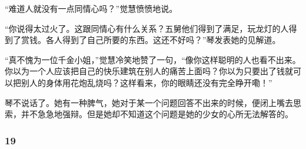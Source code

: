 \par “难道人就没有一点同情心吗？”觉慧愤愤地说。
\par “你说得太过火了。这跟同情心有什么关系？五舅他们得到了满足，玩龙灯的人得到了赏钱。各人得到了自己所要的东西。这还不好吗？”琴发表她的见解道。
\par “真不愧为一位千金小姐，”觉慧冷笑地赞了一句，“像你这样聪明的人也看不出来。你以为一个人应该把自己的快乐建筑在别人的痛苦上面吗？你以为只要出了钱就可以把别人的身体用花炮乱烧吗？这样看来，你的眼睛还没有完全睁开嘞！”
\par 琴不说话了。她有一种脾气，她对于某一个问题回答不出来的时候，便闭上嘴去思索，并不急急地强辩。但是她却不知道这个问题是她的少女的心所无法解答的。



\subsubsection*{19}

